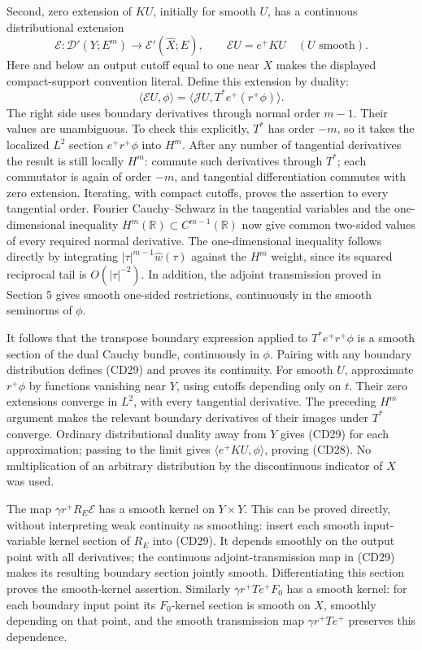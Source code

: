 \documentclass[
  11pt,
]{article}
\begin{document}
Second, zero extension of \(KU\), initially for smooth \(U\), has a
continuous distributional extension \[
\mathcal E:\mathcal D'(Y;E^m)\longrightarrow
\mathcal E'(\widehat X;E),\qquad \mathcal E U=e^+KU\quad(U\text{ smooth}).
\tag{CD28}
\] Here and below an output cutoff equal to one near \(X\) makes the
displayed compact-support convention literal. Define this extension by
duality: \[
\langle\mathcal E U,\phi\rangle
=\langle\mathcal JU,T^*e^+(r^+\phi)\rangle.
\tag{CD29}
\] The right side uses boundary derivatives through normal order
\(m-1\). Their values are unambiguous. To check this explicitly, \(T^*\)
has order \(-m\), so it takes the localized \(L^2\) section
\(e^+r^+\phi\) into \(H^m\). After any number of tangential derivatives
the result is still locally \(H^m\): commute such derivatives through
\(T^*\); each commutator is again of order \(-m\), and tangential
differentiation commutes with zero extension. Iterating, with compact
cutoffs, proves the assertion to every tangential order. Fourier
Cauchy--Schwarz in the tangential variables and the one-dimensional
inequality \(H^m(\mathbb R)\subset C^{m-1}(\mathbb R)\) now give common
two-sided values of every required normal derivative. The
one-dimensional inequality follows directly by integrating
\(|\tau|^{m-1}\widehat w(\tau)\) against the \(H^m\) weight, since its
squared reciprocal tail is \(O(|\tau|^{-2})\). In addition, the adjoint
transmission proved in Section 5 gives smooth one-sided restrictions,
continuously in the smooth seminorms of \(\phi\).

It follows that the transpose boundary expression applied to
\(T^*e^+r^+\phi\) is a smooth section of the dual Cauchy bundle,
continuously in \(\phi\). Pairing with any boundary distribution defines
(CD29) and proves its continuity. For smooth \(U\), approximate
\(r^+\phi\) by functions vanishing near \(Y\), using cutoffs depending
only on \(t\). Their zero extensions converge in \(L^2\), with every
tangential derivative. The preceding \(H^m\) argument makes the relevant
boundary derivatives of their images under \(T^*\) converge. Ordinary
distributional duality away from \(Y\) gives (CD29) for each
approximation; passing to the limit gives \(\langle e^+KU,\phi\rangle\),
proving (CD28). No multiplication of an arbitrary distribution by the
discontinuous indicator of \(X\) was used.

The map \(\gamma r^+R_E\mathcal E\) has a smooth kernel on
\(Y\times Y\). This can be proved directly, without interpreting weak
continuity as smoothing: insert each smooth input-variable kernel
section of \(R_E\) into (CD29). It depends smoothly on the output point
with all derivatives; the continuous adjoint-transmission map in (CD29)
makes its resulting boundary section jointly smooth. Differentiating
this section proves the smooth-kernel assertion. Similarly
\(\gamma r^+Te^+F_0\) has a smooth kernel: for each boundary input point
its \(F_0\)-kernel section is smooth on \(X\), smoothly depending on
that point, and the smooth transmission map \(\gamma r^+Te^+\) preserves
this dependence.
\end{document}
